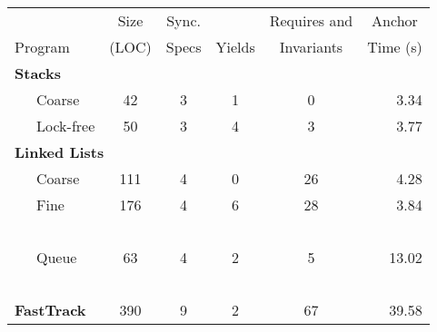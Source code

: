 \documentclass{article}
\begin{document}
       \begin{tabular}{llccccr}
       & & \multicolumn{1}{c}{Size}  & \multicolumn{1}{c}{Sync.} & & \multicolumn{1}{c}{Requires and}  & \multicolumn{1}{c}{Anchor}  \\
        \multicolumn{2}{l}{Program} & \multicolumn{1}{c}{(LOC)}  & \multicolumn{1}{c}{Specs} & \multicolumn{1}{c}{Yields} &  \multicolumn{1}{c}{Invariants} & \multicolumn{1}{c}{Time (s)} \\
        \toprule
      
\multicolumn{7}{l}{\bf Stacks}\\
 &  Coarse  &  42  &  3  &  1  &  0  &  3.34 \\   %
 &  Lock-free  &  50  &  3  &  4  &  3  &  3.77 \\   %
\multicolumn{7}{l}{\bf Linked Lists}\\
 &  Coarse  &  111  &  4  &  0  &  26  &  4.28 \\   %
 &  Fine~  &  176  &  4  &  6  &  28  &  3.84 \\   %
~\\[-1ex]
 &  Queue  &  63  &  4  &  2  &  5  &  13.02 \\   %
~\\[-1ex]
 \multicolumn{2}{l}{\bf FastTrack}  &  390  &  9  &  2  &  67  &  39.58 \\   %

\bottomrule
\end{tabular}
\end{document}
